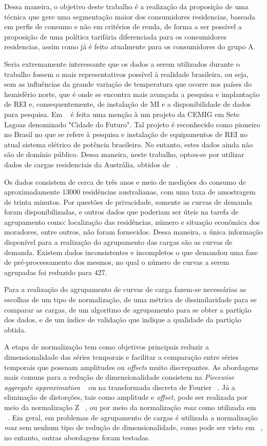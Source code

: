 Dessa maneira, o objetivo deste trabalho é a realização da proposição de uma técnica que gere uma segmentação maior dos consumidores residencias, baseada em perfis de consumo e não em critérios de renda, de forma a ser possível a proposição de uma política tarifária diferenciada para os consumidores residencias, assim como já é feito atualmente para os consumidores do grupo A.

Seria extremamente interessante que os dados a serem utilizados durante o trabalho fossem o mais representativos possível à realidade brasileira, ou seja, sem as influências da grande variação de temperatura que ocorre nos países do hemisfério norte, que é onde se encontra mais avançada a pesquisa e implantação de REI e, consequentemente, de instalação de MI e a disponibilidade de dados para pesquisa. Em ~\parencite{REI} é feita uma menção à um projeto da CEMIG em Sete Lagoas denominado "Cidade do Futuro". Tal projeto é reconhecido como pioneiro no Brasil no que se refere à pesquisa e instalação de equipamentos de REI no atual sistema elétrico de potência brasileiro. No entanto, estes dados ainda não são de domínio público. Dessa maneira, neste trabalho, optou-se por utilizar dados de cargas residenciais da Austrália, obtidos de ~\parencite{dadosAustralia}.

Os dados consistem de cerca de três anos e meio de medições do consumo de aproximadamente 13000 residências australianas, com uma taxa de amostragem de trinta minutos. Por questões de privacidade, somente as curvas de demanda foram disponibilizadas, e outros dados que poderiam ser úteis na tarefa de agrupamento como: localização das residências, número e situação econômica dos moradores, entre outros, não foram fornecidos. Dessa maneira, a única informação disponível para a realização do agrupamento das cargas são as curvas de demanda. Existem dados inconsistentes e incompletos o que demandou uma fase de pré-processamento dos mesmos, no qual o número de curvas a serem agrupadas foi reduzido para 427.

Para a realização do agrupamento de curvas de carga fazem-se necessárias as escolhas de um tipo de normalização, de uma métrica de dissimilaridade para se comparar as cargas, de um algoritmo de agrupamento para se obter a partição dos dados, e de um índice de validação que indique a qualidade da partição obtida. 

A etapa de normalização tem como objetivos principais reduzir a dimensionalidade das séries temporais e  facilitar a comparação entre séries temporais que possuam amplitudes ou \emph{offsets} muito discrepantes. As abordagens mais comuns para a redução de dimensionalidade consistem na \emph{Piecewise aggregate approximation} ~\parencite{SAX} ou na transformada discreta de Fourier ~\parencite{FFT}. Já a eliminação de distorções, tais como amplitude e \emph{offset}, pode ser realizada por meio da normalização Z ~\parencite{trillions}, ou por meio da normalização \emph{max} como utilizada em ~\parencite{Chicco}. Em geral, em problemas de agrupamento de cargas é utilizada a normalização \emph{max} sem nenhum tipo de redução de dimensionalidade, como pode ser visto em ~\parencite{Chicco, Flath2012,Tsekouras20081494}, no entanto, outras abordagens foram testadas.

